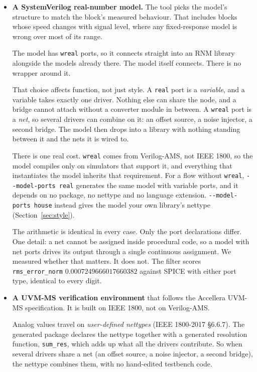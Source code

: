 \documentclass[11pt,a4paper]{article}
\begin{document}
\begin{itemize}[leftmargin=1.5em,itemsep=0.3em]
  \item \textbf{A SystemVerilog real-number model.} The tool picks the
        model's structure to match the block's measured behaviour. That
        includes blocks whose speed changes with signal level, where
        any fixed-response model is wrong over most of its range.

        The model has \texttt{wreal} ports, so it connects straight
        into an RNM library alongside the models already there. The
        model itself connects. There is no wrapper around it.

        That choice affects function, not just style. A \texttt{real}
        port is a \emph{variable}, and a variable takes exactly one
        driver. Nothing else can share the node, and a bridge cannot
        attach without a converter module in between. A \texttt{wreal}
        port is a \emph{net}, so several drivers can combine on it: an
        offset source, a noise injector, a second bridge. The model
        then drops into a library with nothing standing between it and
        the nets it is wired to.

        There is one real cost. \texttt{wreal} comes from Verilog-AMS,
        not IEEE 1800, so the model compiles only on simulators that
        support it, and everything that instantiates the model
        inherits that requirement. For a flow without \texttt{wreal},
        \texttt{-{}-model-ports real} generates the same model with
        variable ports, and it depends on no package, no nettype and
        no language extension. \texttt{-{}-model-ports house} instead
        gives the model your own library's nettype
        (Section~\ref{sec:style}).

        The arithmetic is identical in every case. Only the port
        declarations differ. One detail: a net cannot be assigned
        inside procedural code, so a model with net ports drives its
        output through a single continuous assignment. We measured
        whether that matters. It does not. The filter scores
        \texttt{rms\_error\_norm} $0.0007249666017660382$ against SPICE
        with either port type, identical to every digit.
  \item \textbf{A UVM-MS verification environment} that follows the
        Accellera UVM-MS specification. It is built on IEEE 1800, not
        on Verilog-AMS.

        Analog values travel on \emph{user-defined nettypes} (IEEE
        1800-2017 \S6.6.7). The generated package declares the nettype
        together with a generated resolution function,
        \texttt{sum\_res}, which adds up what all the drivers
        contribute. So when several drivers share a net (an offset
        source, a noise injector, a second bridge), the nettype
        combines them, with no hand-edited testbench code.


\end{itemize}
\end{document}
